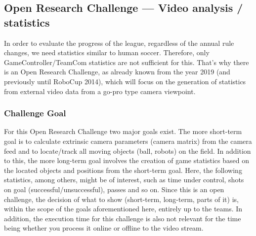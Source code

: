\newpage

\subsection{Open Research Challenge — Video analysis / statistics}
In order to evaluate the progress of the league, regardless of the annual rule changes, we need statistics similar to human soccer. Therefore, only GameController/TeamCom statistics are not sufficient for this. That's why there is an Open Research Challenge, as already known from the year 2019 (and previously until RoboCup 2014), which will focus on the generation of statistics from external video data from a go-pro type camera viewpoint.

    \subsubsection{Challenge Goal}
    For this Open Research Challenge two major goals exist. The more short-term goal is to calculate extrinsic camera parameters (camera matrix) from the camera feed and to locate/track all moving objects (ball, robots) on the field. In addition to this, the more long-term goal involves the creation of game statistics based on the located objects and positions from the short-term goal. Here, the following statistics, among others, might be of interest, such as time under control, shots on goal (successful/unsuccessful), passes and so on. Since this is an open challenge, the decision of what to show (short-term, long-term, parts of it) is, within the scope of the goals aforementioned here, entirely up to the teams. In addition, the execution time for this challenge is also not relevant for the time being whether you process it online or offline to the video stream.

